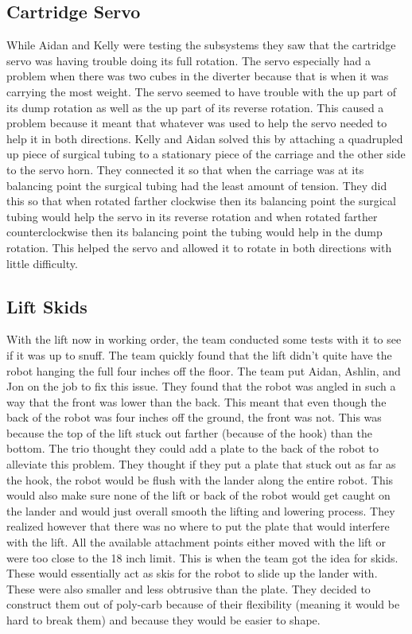 \documentclass{article}
\begin{document}
\subsection{Cartridge Servo}
While Aidan and Kelly were testing the subsystems they saw that the cartridge servo was having trouble doing its full rotation. The servo especially had a problem when there was two cubes in the diverter because that is when it was carrying the most weight. The servo seemed to have trouble with the up part of its dump rotation as well as the up part of its reverse rotation. This caused a problem because it meant that whatever was used to help the servo needed to help it in both directions. Kelly and Aidan solved this by attaching a quadrupled up piece of surgical tubing to a stationary piece of the carriage and the other side to the servo horn. They connected it so that when the carriage was at its balancing point the surgical tubing had the least amount of tension. They did this so that when rotated farther clockwise then its balancing point the surgical tubing would help the servo in its reverse rotation and when rotated farther counterclockwise then its balancing point the tubing would help in the dump rotation. This helped the servo and allowed it to rotate in both directions with little difficulty.

\subsection{Lift Skids}
With the lift now in working order, the team conducted some tests with it to see if it was up to snuff. The team quickly found that the lift didn't quite have the robot hanging the full four inches off the floor. The team put Aidan, Ashlin, and Jon on the job to fix this issue. They found that the robot was angled in such a way that the front was lower than the back. This meant that even though the back of the robot was four inches off the ground, the front was not. This was because the top of the lift stuck out farther (because of the hook) than the bottom. The trio thought they could add a plate to the back of the robot to alleviate this problem. They thought if they put a plate that stuck out as far as the hook, the robot would be flush with the lander along the entire robot. This would also make sure none of the lift or back of the robot would get caught on the lander and would just overall smooth the lifting and lowering process. They realized however that there was no where to put the plate that would interfere with the lift. All the available attachment points either moved with the lift or were too close to the 18 inch limit. This is when the team got the idea for skids. These would essentially act as skis for the robot to slide up the lander with. These were also smaller and less obtrusive than the plate. They decided to construct them out of poly-carb because of their flexibility (meaning it would be hard to break them) and because they would be easier to shape.
\end{document}

